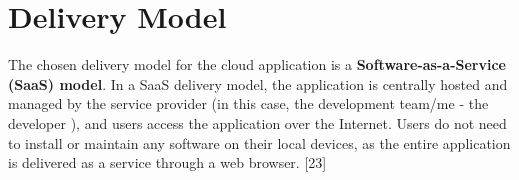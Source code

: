 
\newpage

\clearpage

\chapter{Delivery Model}
The chosen delivery model for the cloud application is a \textbf{Software-as-a-Service (SaaS) model}. In a SaaS delivery model, the application is centrally hosted and managed by the service provider (in this case, the development team/me - the developer ), and users access the application over the Internet. Users do not need to install or maintain any software on their local devices, as the entire application is delivered as a service through a web browser. [23]

